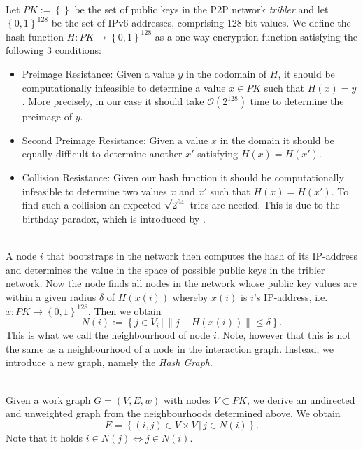 \begin{definition}\ \\
Let $PK:=\left\lbrace \right\rbrace$ be the set of public keys in the P2P network {\it tribler} and let ${\left\lbrace{}0,1\right\rbrace}^{128}$ be the set of IPv6 addresses, comprising 128-bit values. We define the hash function $H:PK\rightarrow{\left\lbrace{}0,1\right\rbrace}^{128}$ as a one-way encryption function satisfying the following 3 conditions:
\begin{itemize}
\item Preimage Resistance: Given a value $y$ in the codomain of $H$, it should be computationally infeasible to determine a value $x\in{}PK$ such that $H(x)=y$. More precisely, in our case it should take $\mathcal{O}(2^{128})$ time to determine the preimage of $y$.
\item Second Preimage Resistance: Given a value $x$ in the domain it should be equally difficult to determine another $x'$ satisfying $H(x)=H(x')$.
\item Collision Resistance: Given our hash function it should be computationally infeasible to determine two values $x$ and $x'$ such that $H(x)=H(x')$. To find such a collision an expected $\sqrt{2^{64}}$ tries are needed. This is due to the birthday paradox, which is introduced by \cite{Cryptography made simple}. 
\end{itemize}
\end{definition}

\begin{definition}\ \\
\noindent{}A node $i$ that bootstraps in the network then computes the hash of its IP-address and determines the value in the space of possible public keys in the tribler network. Now the node finds all nodes in the network whose public key values are within a given radius $\delta$ of $H(x(i))$ whereby $x(i)$ is $i$'s IP-address, i.e. $x:PK\rightarrow{}{\left\lbrace 0,1\right\rbrace}^{128}$. Then we obtain
\[
N(i):=\left\lbrace{}j\in{}V_i\,|\,\|j-H(x(i))\| \leq\delta \right\rbrace.
\]
This is what we call the neighbourhood of node $i$. Note, however that this is not the same as a neighbourhood of a node in the interaction graph. Instead, we introduce a new graph, namely the {\it Hash Graph}.
\end{definition}

\begin{definition}\ \\
Given a work graph $G=(V,E,w)$ with nodes $V\subset{}PK$, we derive an undirected and unweighted graph from the neighbourhoods determined above. We obtain 
\[
E=\left\lbrace{}(i,j)\in{}V\times{}V\,|\,j\in{}N(i)\right\rbrace{}.
\]
Note that it holds $i\in{}N(j)\Leftrightarrow{}j\in{}N(i)$. 
\end{definition}

